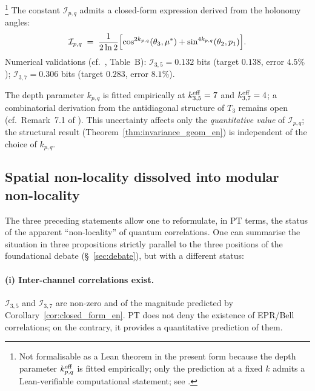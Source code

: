 \begin{corollary}
\label{cor:closed_form_en}
\footnote{Not formalisable as a Lean theorem in the present form
because the depth parameter $k_{p,q}^{\rm eff}$ is fitted
empirically; only the prediction at a fixed $k$ admits a
Lean-verifiable computational statement;
see \cite[\S~8.5]{PT_CRT_DECOUPLING}.}
The constant $\mathcal{I}_{p,q}$ admits a closed-form expression
derived from the holonomy angles:
\begin{equation}
  \mathcal{I}_{p,q}
  \;=\;
  \frac{1}{2 \ln 2}\Bigl[
    \cos^{2 k_{p,q}}(\theta_3, \mu^\ast)
    + \sin^{4 k_{p,q}}(\theta_2, p_1)
  \Bigr].
  \label{eq:closed_form_en}
\end{equation}
Numerical validations (cf.\ \cite{PT_CRT_DECOUPLING}, Table~B):
$\mathcal{I}_{3,5} = 0.132$ bits (target $0.138$, error $4.5\%$);
$\mathcal{I}_{3,7} = 0.306$ bits (target $0.283$, error $8.1\%$).
\end{corollary}

The depth parameter $k_{p,q}$ is fitted empirically at
$k_{3,5}^{\rm eff} = 7$ and $k_{3,7}^{\rm eff} = 4$; a
combinatorial derivation from the antidiagonal structure of $T_3$
remains open (cf.\ Remark~7.1 of \cite{PT_CRT_DECOUPLING}). This
uncertainty affects only the \emph{quantitative value} of
$\mathcal{I}_{p,q}$; the structural result
(Theorem~\ref{thm:invariance_geom_en}) is independent of the
choice of $k_{p,q}$.

\subsection{Spatial non-locality dissolved into modular non-locality}
\label{ssec:dissolution_en}

The three preceding statements allow one to reformulate, in PT
terms, the status of the apparent ``non-locality'' of quantum
correlations. One can summarise the situation in three propositions
strictly parallel to the three positions of the foundational
debate (\S~\ref{sec:debate}), but with a different status:

\paragraph{(i) Inter-channel correlations exist.}
$\mathcal{I}_{3,5}$ and $\mathcal{I}_{3,7}$ are non-zero and of the
magnitude predicted by Corollary~\ref{cor:closed_form_en}. PT does
not deny the existence of EPR/Bell correlations; on the contrary,
it provides a quantitative prediction of them.

